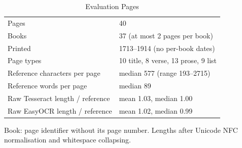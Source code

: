 \begin{table}[t]
\centering
\caption{Evaluation Pages}
\label{tab:dataset}
\setlength{\tabcolsep}{4pt}
\footnotesize
\begin{tabular}{ll}
\toprule
Pages & 40 \\
Books & 37 (at most 2 pages per book) \\
Printed & 1713--1914 (no per-book dates) \\
Page types & 10 title, 8 verse, 13 prose, 9 list \\
Reference characters per page & median 577 (range 193--2715) \\
Reference words per page & median 89 \\
Raw Tesseract length / reference & mean 1.03, median 1.00 \\
Raw EasyOCR length / reference & mean 1.02, median 0.99 \\
\bottomrule
\end{tabular}
\par\smallskip
\begin{minipage}{\linewidth}\footnotesize Book: page identifier without its page number. Lengths after Unicode NFC normalisation and whitespace collapsing.\end{minipage}
\end{table}
